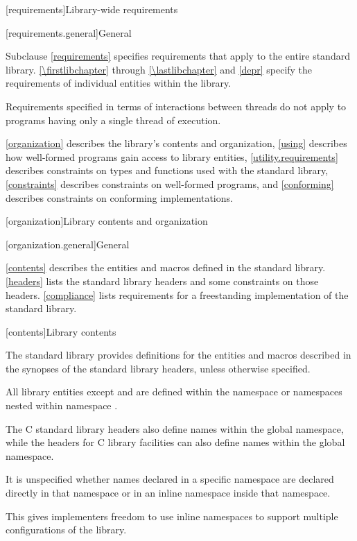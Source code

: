[requirements]{Library-wide requirements}

[requirements.general]{General}

\pnum
Subclause \ref{requirements} specifies requirements that apply to the entire \Cpp{} standard library.
\ref{\firstlibchapter} through \ref{\lastlibchapter} and \ref{depr}
specify the requirements of individual entities within the library.

\pnum
Requirements specified in terms of interactions between threads do not apply to
programs having only a single thread of execution.

\pnum
\ref{organization} describes the library's contents and
organization, \ref{using} describes how well-formed \Cpp{} programs gain access to library
entities,
\ref{utility.requirements} describes constraints on types and functions used with
the \Cpp{} standard library,
\ref{constraints} describes constraints on well-formed \Cpp{} programs, and
\ref{conforming} describes constraints on conforming implementations.

[organization]{Library contents and organization}

[organization.general]{General}

\pnum
\ref{contents} describes the entities and macros defined in the \Cpp{} standard library.
\ref{headers} lists the standard library headers and some constraints on those headers.
\ref{compliance} lists requirements for a freestanding implementation of the \Cpp{}
standard library.

[contents]{Library contents}

\pnum
The \Cpp{} standard library provides definitions
for the entities and macros described in the synopses
of the \Cpp{} standard library headers,
unless otherwise specified.

\pnum
All library entities except
and
are defined within the namespace
or namespaces nested within namespace
.
\begin{footnote}
The C standard library headers also define
names within the global namespace, while the \Cpp{} headers for C library
facilities can also define names within the global namespace.
\end{footnote}
It is unspecified whether names declared in a specific namespace are declared
directly in that namespace or in an inline namespace inside that
namespace.
\begin{footnote}
This gives implementers freedom to use inline namespaces to
support multiple configurations of the library.
\end{footnote}

